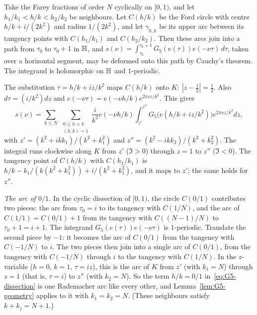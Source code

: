 \begin{lemma}\label{lem:farey}
Take the Farey fractions of order $N$ cyclically on $[0,1)$, and let $h_1/k_1<h/k<h_2/k_2$ be neighbours. Let $C(h/k)$ be
the Ford circle with centre $h/k+i/(2k^2)$ and radius $1/(2k^2)$, and let $\gamma_{h,k}$ be its upper arc between its
tangency points with $C(h_1/k_1)$ and $C(h_2/k_2)$. Then these arcs join into a path from $\tau_0$ to $\tau_0+1$ in $\mathbb H$,
and $s(\nu)=\int_{\tau_0}^{\tau_0+1}G_5(e(\tau))e(-\nu\tau)\,d\tau$, taken over a horizontal segment, may be deformed onto
this path by Cauchy's theorem. The integrand is holomorphic on $\mathbb H$ and $1$-periodic.
\end{lemma}

The substitution $\tau=h/k+iz/k^2$ maps $C(h/k)$ onto $K:\ |z-\tfrac12|=\tfrac12$. Also $d\tau=(i/k^2)dz$ and
$e(-\nu\tau)=e(-\nu h/k)e^{2\pi\nu z/k^2}$. This gives
\begin{equation}\label{eq:G5-dissection}
s(\nu)=\sum_{k\le N}\ \sum_{\substack{0\le h<k\\(h,k)=1}}\frac i{k^2}e(-\nu h/k)\int_{z'}^{z''}G_5\big(e(h/k+iz/k^2)\big)e^{2\pi\nu z/k^2}dz,
\end{equation}
with $z'=(k^2+ikk_1)/(k^2+k_1^2)$ and $z''=(k^2-ikk_2)/(k^2+k_2^2)$. The integral runs clockwise along $K$ from $z'$
($\Im>0$) through $z=1$ to $z''$ ($\Im<0$). The tangency point of $C(h/k)$ with $C(h_1/k_1)$ is
$h/k-k_1/(k(k^2+k_1^2))+i/(k^2+k_1^2)$, and it maps to $z'$; the same holds for $z''$.

\emph{The arc of $0/1$.} In the cyclic dissection of $[0,1)$, the circle $C(0/1)$ contributes two pieces: the arc from
$\tau_0=i$ to its tangency with $C(1/N)$, and the arc of $C(1/1)=C(0/1)+1$ from its tangency with $C((N-1)/N)$ to
$\tau_0+1=i+1$. The integrand $G_5(e(\tau))e(-\nu\tau)$ is $1$-periodic. Translate the second piece by $-1$: it becomes the
arc of $C(0/1)$ from the tangency with $C(-1/N)$ to $i$. The two pieces then join into a single arc of $C(0/1)$, from the
tangency with $C(-1/N)$ through $i$ to the tangency with $C(1/N)$. In the $z$-variable ($h=0$, $k=1$, $\tau=iz$), this is
the arc of $K$ from $z'$ (with $k_1=N$) through $z=1$ (that is, $\tau=i$) to $z''$ (with $k_2=N$). So the term $h/k=0/1$
in~\eqref{eq:G5-dissection} is one Rademacher arc like every other, and Lemma~\ref{lem:G5-geometry} applies to it with
$k_1=k_2=N$. (These neighbours satisfy $k+k_j=N+1$.)

